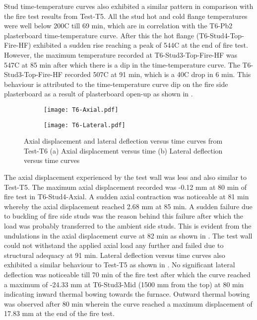 Stud time-temperature curves also exhibited a similar pattern in comparison with the fire test results from Test-T5. All the stud hot and cold flange temperatures were well below 200\degree C till 69 min, which are in correlation with the T6-Pb2 plasterboard time-temperature curve. After this the hot flange (T6-Stud4-Top-Fire-HF) exhibited a sudden rise reaching a peak of 544\degree C at the end of fire test. However, the maximum temperature recorded at T6-Stud3-Top-Fire-HF was 547\degree C at 85 min after which there is a dip in the time-temperature curve. The T6-Stud3-Top-Fire-HF recorded 507\degree C at 91 min, which is a 40\degree C drop in 6 min. This behaviour is attributed to the time-temperature curve dip on the fire side plasterboard as a result of plasterboard open-up as shown in . 
\begin{figure}[!htbp]
	\centering
	\begin{subfigure}[b]{0.7\textwidth}
		\centering
		\texttt{[image: T6-Axial.pdf]}
		\caption{}
		\label{subfig:T6-Axial}
	\end{subfigure}
	\begin{subfigure}[b]{0.7\textwidth}
		\centering
		\texttt{[image: T6-Lateral.pdf]}
		\caption{}
		\label{subfig:T6-Lateral}
	\end{subfigure}
	   \caption{Axial displacement and lateral deflection versus time curves from Test-T6 (a) Axial displacement versus time (b) Lateral deflection versus time curves}
	   \label{fig:T6-Axial-Lateral}
\end{figure}

The axial displacement experienced by the test wall was less and also similar to Test-T5. The maximum axial displacement recorded was -0.12 mm at 80 min of fire test in T6-Stud4-Axial. A sudden axial contraction was noticeable at 81 min whereby the axial displacement reached 2.68 mm at 85 min. A sudden failure due to buckling of fire side studs was the reason behind this failure after which the load was probably transferred to the ambient side studs. This is evident from the undulations in the axial displacement curve at 82 min as shown in . The test wall could not withstand the applied axial load any further and failed due to structural adequacy at 91 min. Lateral deflection versus time curves also exhibited a similar behaviour to Test-T5 as shown in . No significant lateral deflection was noticeable till 70 min of the fire test after which the curve reached a maximum of -24.33 mm at T6-Stud3-Mid (1500 mm from the top) at 80 min indicating inward thermal bowing towards the furnace. Outward thermal bowing was observed after 80 min wherein the curve reached a maximum displacement of 17.83 mm at the end of the fire test.

